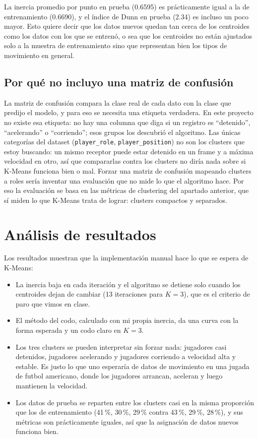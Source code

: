 \documentclass[11pt,a4paper]{article}
\begin{document}
La inercia promedio por punto en prueba (0.6595) es prácticamente igual a la de entrenamiento (0.6690), y el índice de Dunn en prueba (2.34) es incluso un poco mayor. Esto quiere decir que los datos nuevos quedan tan cerca de los centroides como los datos con los que se entrenó, o sea que los centroides no están ajustados solo a la muestra de entrenamiento sino que representan bien los tipos de movimiento en general.

\subsection{Por qué no incluyo una matriz de confusión}

La matriz de confusión compara la clase real de cada dato con la clase que predijo el modelo, y para eso se necesita una etiqueta verdadera. En este proyecto no existe esa etiqueta: no hay una columna que diga si un registro es ``detenido'', ``acelerando'' o ``corriendo''; esos grupos los descubrió el algoritmo. Las únicas categorías del dataset (\texttt{player\_role}, \texttt{player\_position}) no son los clusters que estoy buscando: un mismo receptor puede estar detenido en un frame y a máxima velocidad en otro, así que compararlas contra los clusters no diría nada sobre si K-Means funciona bien o mal. Forzar una matriz de confusión mapeando clusters a roles sería inventar una evaluación que no mide lo que el algoritmo hace. Por eso la evaluación se basa en las métricas de clustering del apartado anterior, que sí miden lo que K-Means trata de lograr: clusters compactos y separados.

\section{Análisis de resultados}

Los resultados muestran que la implementación manual hace lo que se espera de K-Means:

\begin{itemize}
  \item La inercia baja en cada iteración y el algoritmo se detiene solo cuando los centroides dejan de cambiar (13 iteraciones para $K=3$), que es el criterio de paro que vimos en clase.
  \item El método del codo, calculado con mi propia inercia, da una curva con la forma esperada y un codo claro en $K=3$.
  \item Los tres clusters se pueden interpretar sin forzar nada: jugadores casi detenidos, jugadores acelerando y jugadores corriendo a velocidad alta y estable. Es justo lo que uno esperaría de datos de movimiento en una jugada de futbol americano, donde los jugadores arrancan, aceleran y luego mantienen la velocidad.
  \item Los datos de prueba se reparten entre los clusters casi en la misma proporción que los de entrenamiento (41\,\%, 30\,\%, 29\,\% contra 43\,\%, 29\,\%, 28\,\%), y sus métricas son prácticamente iguales, así que la asignación de datos nuevos funciona bien.
\end{itemize}
\end{document}
